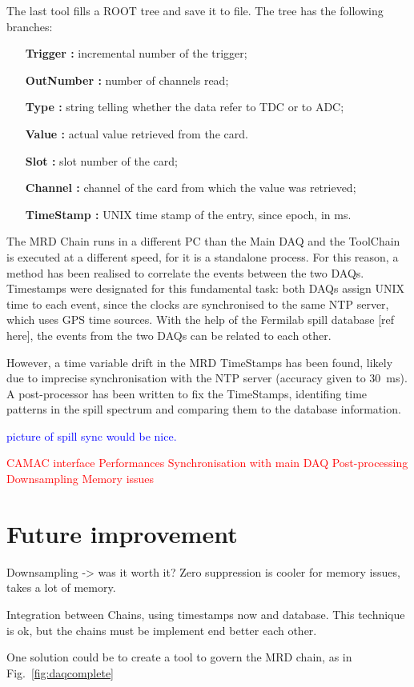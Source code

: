 The last tool fills a ROOT tree and save it to file.
The tree has the following branches:
\begin{center}
\begin{varwidth}{\textwidth}
\begin{itemize}
  \item[\bfseries Trigger :] incremental number of the trigger;
  \item[\bfseries OutNumber :] number of channels read;
  \item[\bfseries Type :] string telling whether the data refer to TDC or to ADC;
  \item[\bfseries Value :] actual value retrieved from the card.
  \item[\bfseries Slot :] slot number of the card;
  \item[\bfseries Channel :] channel of the card from which the value was retrieved;
  \item[\bfseries TimeStamp :] UNIX time stamp of the entry, since epoch, in ms.
\end{itemize}
\end{varwidth}
\end{center}

The MRD Chain runs in a different PC than the Main DAQ and the ToolChain %
is executed at a different speed, for it is a standalone process.
For this reason, a method has been realised to correlate the events between the two DAQs.
Timestamps were designated for this fundamental task: both DAQs assign UNIX time to each event, since %
the clocks are synchronised to the same NTP server, which uses GPS time sources.
With the help of the Fermilab spill database [ref here], the events from the two DAQs can be related %
to each other.

However, a time variable drift in the MRD TimeStamps has been found, likely due to imprecise %
synchronisation with the NTP server (accuracy given to 30~ms). 
A post-processor has been written to fix the TimeStamps, identifing time patterns in the %
spill spectrum and comparing them to the database information.

\textcolor{blue}{picture of spill sync would be nice.}

\textcolor{red}{
CAMAC interface
Performances
Synchronisation with main DAQ
Post-processing
Downsampling
Memory issues
}

\section{Future improvement}
\label{sec:3.3}
{
\color{red}
Downsampling -> was it worth it?
Zero suppression is cooler for memory issues, takes a lot of memory.

Integration between Chains, using timestamps now and database.
This technique is ok, but the chains must be implement end better each other.

One solution could be to create a tool to govern the MRD chain, as in Fig.~\ref{fig:daqcomplete}
}

